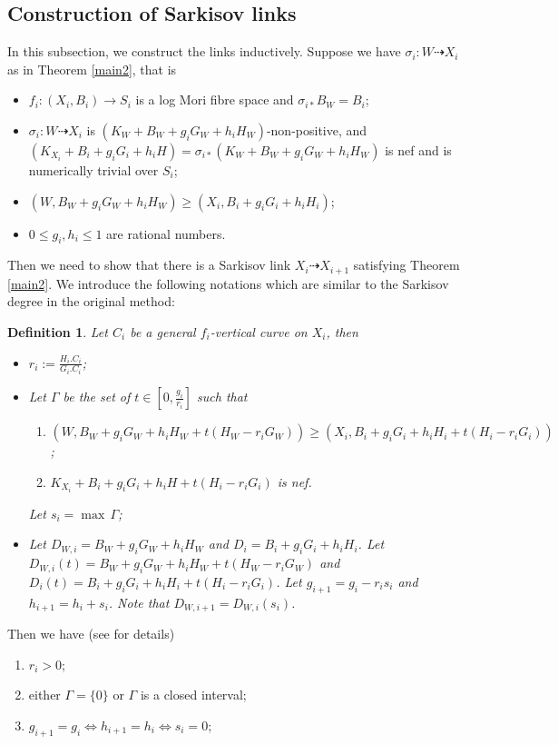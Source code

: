 \documentclass[11pt]{amsart}
\newtheorem{defn}{Definition}[section]
\begin{document}
\subsection{Construction of Sarkisov links}
In this subsection, we construct the links inductively. Suppose we have $\sigma_{i}:W\dashrightarrow X_{i}$ as in Theorem  \ref{main2}, that is
\begin{itemize}
  \item $f_{i}:(X_{i},B_{i})\to S_{i}$ is a log Mori fibre space and $\sigma_{i*} B_{W}=B_{i}$;
  \item $\sigma_{i}:W\dashrightarrow  X_{i}$ is $(K_{W}+B_{W}+g_{i}G_{W}+h_{i}H_{W})$-non-positive, and $(K_{X_{i}}+B_{i}+g_{i}G_{i}+h_{i}H)=\sigma_{i*}(K_{W}+B_{W}+g_{i}G_{W}+h_{i}H_{W})$ is nef and is numerically trivial over $S_{i}$;
  \item $(W,B_{W}+g_{i}G_{W}+h_{i}H_{W})\geqslant (X_{i},B_{i}+g_{i}G_{i}+h_{i}H_{i})$;
  \item $0\leqslant g_{i},h_{i}\leqslant 1$ are  rational numbers.
\end{itemize}
Then we need to show that there is a Sarkisov link $X_{i}\dashrightarrow X_{i+1}$ satisfying  Theorem \ref{main2}. We introduce the following notations which are similar to the Sarkisov degree in the original method:
\begin{defn}
  Let $C_{i}$ be a general $f_{i}$-vertical curve on $X_{i}$, then
  \begin{itemize}
    \item $r_{i}:=\frac{H_{i}.C_{i}}{G_{i}.C_{i}}$;
    \item Let $\Gamma$ be the set of $t\in [0,\frac{g_{i}}{r_{i}}] $ such that
          \begin{enumerate}
            \item\label{singularcondition} $\left(W,B_{W}+g_{i}G_{W}+h_{i}H_{W}+t(H_{W}-r_{i}G_{W})\right)\geqslant \left(X_{i},B_{i}+g_{i}G_{i}+h_{i}H_{i}+t\left(H_{i}-r_{i}G_{i}\right)\right)$;
            \item$K_{X_{i}}+B_{i}+g_{i}G_i+h_{i}H+t(H_{i}-r_{i}G_{i})$ is nef.
          \end{enumerate}
          Let $s_{i}=\max\, \Gamma $;
    \item Let $D_{W,i}=B_{W}+g_{i}G_{W}+h_{i}H_{W}$ and $D_{i}=B_{i}+g_{i}G_{i}+h_{i}H_{i}$. Let $D_{W,i}(t)=B_{W}+g_{i}G_{W}+h_{i}H_{W}+t(H_{W}-r_{i}G_{W})$ and $D_{i}(t)=B_{i}+g_{i}G_{i}+h_{i}H_{i}+t (H_{i}-r_{i}G_{i})$. Let $g_{i+1}=g_{i}-r_{i}s_{i}$ and $h_{i+1}=h_{i}+s_{i}$. Note that $D_{W,i+1}=D_{W,i}(s_{i})$.
  \end{itemize}
\end{defn}
Then we have (see \cite[Lemma 4.4]{liuSarkisovProgramGeneralized2021} for details)
\begin{enumerate}
  \item $r_{i}>0$;
  \item either $\Gamma=\{0\} $ or $\Gamma$ is a closed interval;
  \item $g_{i+1}=g_{i} \Leftrightarrow h_{i+1}=h_{i} \Leftrightarrow s_{i}=0$;
\end{enumerate}
\end{document}
